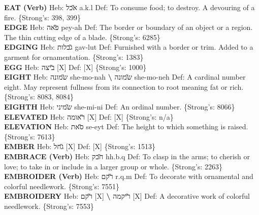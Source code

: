 {\textbf{EAT (Verb)} Heb: {\large\H אכל} a.k.l Def: To consume food; to destroy. A devouring of a fire. \{Strong's: 398, 399\}\hfill{}\\

\textbf{EDGE} Heb: {\large\H פאה} pey-ah Def: The border or boundary of an object or a region. The thin cutting edge of a blade. \{Strong's: 6285\}\hfill{}\\

\textbf{EDGING} Heb: {\large\H גבלות} gav-lut Def: Furnished with a border or trim. Added to a garment for ornamentation. \{Strong's: 1383\}\hfill{}\\

\textbf{EGG} Heb: {\large\H ביצה} {[}X{]} Def: {[}X{]} \{Strong's: 1000\}\hfill{}\\

\textbf{EIGHT} Heb: {\large\H שמונה} she-mo-nah \textbf{\textbackslash{}} {\large\H שמונה} she-mo-neh Def: A cardinal number eight. May represent fullness from its connection to root meaning fat or rich. \{Strong's: 8083, 8084\}\hfill{}\\

\textbf{EIGHTH} Heb: {\large\H שמיני} she-mi-ni Def: An ordinal number. \{Strong's: 8066\}\hfill{}\\

\textbf{ELEVATED} Heb: {\large\H ראומה} {[}X{]} Def: {[}X{]} \{Strong's: n/a\}\hfill{}\\

\textbf{ELEVATION} Heb: {\large\H סאת} se-eyt Def: The height to which something is raised. \{Strong's: 7613\}\hfill{}\\

\textbf{EMBER} Heb: {\large\H גחל} {[}X{]} Def: {[}X{]} \{Strong's: 1513\}\hfill{}\\

\textbf{EMBRACE (Verb)} Heb: {\large\H חבק} hh.b.q Def: To clasp in the arms; to cherish or love; to take in or include in a larger group or whole. \{Strong's: 2263\}\hfill{}\\

\textbf{EMBROIDER (Verb)} Heb: {\large\H רקם} r.q.m Def: To decorate with ornamental and colorful needlework. \{Strong's: 7551\}\hfill{}\\

\textbf{EMBROIDERY} Heb: {\large\H רקם} {[}X{]} \textbf{\textbackslash{}} {\large\H ריקמה} {[}X{]} Def: A decorative work of colorful needlework. \{Strong's: 7553\}\hfill{}\\

}
